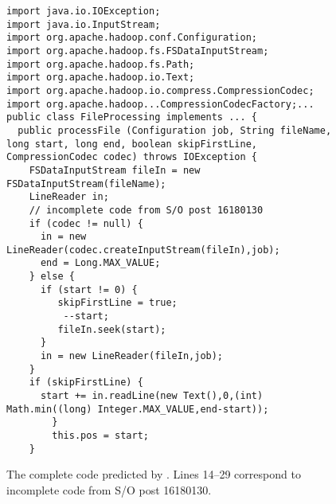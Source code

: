 \begin{figure}[t]
	\centering
\begin{lstlisting}[]
import java.io.IOException;
import java.io.InputStream;
import org.apache.hadoop.conf.Configuration;
import org.apache.hadoop.fs.FSDataInputStream;
import org.apache.hadoop.fs.Path;
import org.apache.hadoop.io.Text;
import org.apache.hadoop.io.compress.CompressionCodec;
import org.apache.hadoop...CompressionCodecFactory;...
public class FileProcessing implements ... {
  public processFile (Configuration job, String fileName, long start, long end, boolean skipFirstLine, CompressionCodec codec) throws IOException {
    FSDataInputStream fileIn = new FSDataInputStream(fileName);
    LineReader in;
    // incomplete code from S/O post 16180130
    if (codec != null) {
      in = new LineReader(codec.createInputStream(fileIn),job);
      end = Long.MAX_VALUE;
    } else {
      if (start != 0) {
         skipFirstLine = true;
          --start;
         fileIn.seek(start);
      }
      in = new LineReader(fileIn,job);
    }
    if (skipFirstLine) { 
      start += in.readLine(new Text(),0,(int) Math.min((long) Integer.MAX_VALUE,end-start));
        }
        this.pos = start;
    }
\end{lstlisting}
\vspace{-12pt}
\caption{The complete code predicted by {\tool}. Lines 14--29 correspond to incomplete code from S/O post 16180130.}
\label{fig:pca}
\end{figure}
